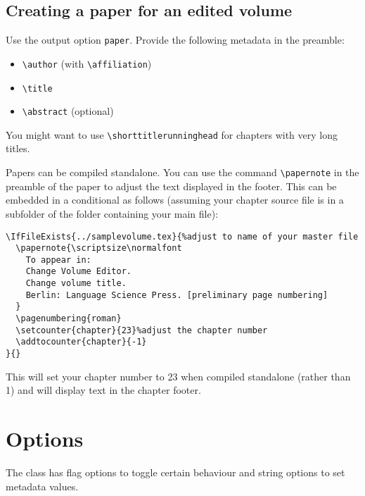 \documentclass[%
output=guidelines,guidelines]{../langscibook}
\begin{document}
\section{Creating a paper for an edited volume}
Use the output option \texttt{paper}. Provide the following metadata in the preamble:
\begin{itemize}
 \item \verb+\author+ (with \verb+\affiliation+)
 \item \verb+\title+
 \item \verb+\abstract+ (optional)
\end{itemize}

You might want to use \verb+\shorttitlerunninghead+ for chapters with very long titles.

Papers can be compiled standalone. You can use the command \verb+\papernote+ in the preamble of the paper to adjust the text displayed in the footer.  This can be embedded in a conditional as follows (assuming your chapter source file is in a subfolder of the folder containing your main file):
\begin{verbatim}
\IfFileExists{../samplevolume.tex}{%adjust to name of your master file
  \papernote{\scriptsize\normalfont
    To appear in:
    Change Volume Editor.
    Change volume title.
    Berlin: Language Science Press. [preliminary page numbering]
  }
  \pagenumbering{roman}
  \setcounter{chapter}{23}%adjust the chapter number
  \addtocounter{chapter}{-1}
}{}
\end{verbatim}

This will set your chapter number to 23 when compiled standalone (rather than 1) and will display text in the chapter footer.




\chapter{Options}
The class has flag options to toggle certain behaviour and string options to set metadata values.
\end{document}
